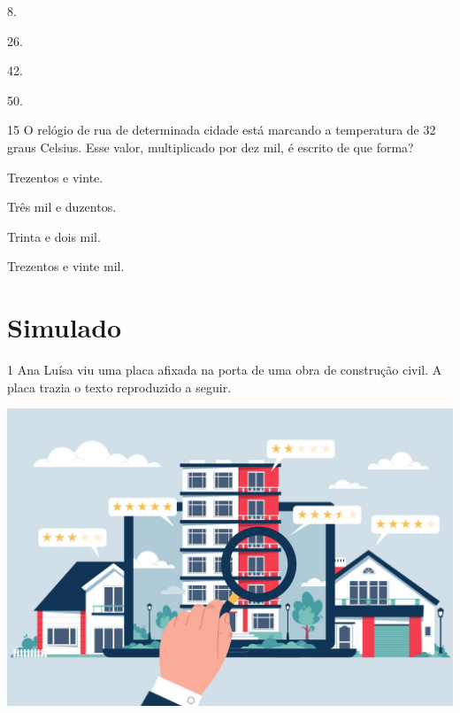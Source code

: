 \begin{escolha}
\item
  8.
\item
  26.
\item
  42.
\item
  50.
\end{escolha}


\num{15} O relógio de rua de determinada cidade está marcando a temperatura
de 32 graus Celsius. Esse valor, multiplicado por dez mil, é escrito de que forma?

\begin{escolha}
\item Trezentos e vinte.
\item Três mil e duzentos.
\item Trinta e dois mil.
\item Trezentos e vinte mil.
\end{escolha}
\pagebreak

\chapter[Simulado 4]{Simulado}

\pagebreak
\num{1} Ana Luísa viu uma placa afixada na porta de uma obra de construção civil. A placa trazia o texto reproduzido a seguir.

\begin{center}
\includegraphics[width=\textwidth]{media/image86a.jpeg}
\end{center}

